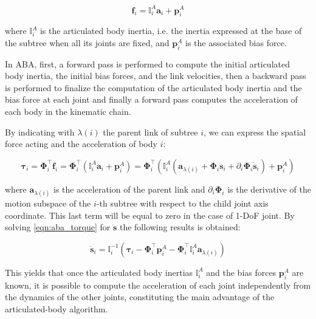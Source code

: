 \begin{equation}
    \label{eqn:biasforce}
    \mathbf{f} _i = \mathbb{I} _i ^A \mathbf{a} _i + \mathbf{p} ^A _i
\end{equation}

where $\mathbb{I} _i ^A$ is the articulated body inertia, i.e. the inertia expressed at the base of the subtree when all its joints are fixed, and $\mathbf{p} ^A _i$ is the associated bias force.

In ABA, first, a forward pass is performed to compute the initial articulated body inertia, the initial bias forces, and the link velocities, then a backward pass is performed to finalize the computation of the articulated body inertia and the bias force at each joint and finally a forward pass computes the acceleration of each body in the kinematic chain.

By indicating with $\lambda(i)$ the parent link of subtree $i$, we can express the spatial force acting and the acceleration of body $i$:

\begin{equation}
    \label{eqn:aba_torque}
    \boldsymbol{\tau} _i = \boldsymbol{\Phi} ^\top _i \mathbf{f} _i = \boldsymbol{\Phi} ^\top _i (\mathbb{I} _i ^A \mathbf{a} _i + \mathbf{p} ^A _i) = \boldsymbol{\Phi} ^\top _i (\mathbb{I} _i ^A (\mathbf{a} _{\lambda(i)} + \boldsymbol{\Phi} _i \ddot{\mathbf{s}} _i + \partial_i \boldsymbol{\Phi} _i \dot{\mathbf{s}} _i)+ \mathbf{p} ^A _i)
\end{equation}

where $\mathbf{a} _{\lambda(i)}$ is the acceleration of the parent link and $\partial_i \boldsymbol{\Phi} _i$ is the derivative of the motion subspace of the $i$-th subtree with respect to the child joint axis coordinate. This last term will be equal to zero in the case of 1-\ac{DoF} joint.
By solving \cref{eqn:aba_torque} for $\ddot{\mathbf{s}}$ the following results is obtained:

\begin{equation}
    \ddot{\mathbf{s}} _i = \mathbb{I} _i ^{-1} (\boldsymbol{\tau} _i - \boldsymbol{\Phi} ^\top _i \mathbf{p} ^A _i - \boldsymbol{\Phi} ^\top _i \mathbb{I} _i ^A \mathbf{a} _{\lambda(i)})
\end{equation}

This yields that once the articulated body inertias $\mathbb{I} _i ^A$ and the bias forces $\mathbf{p}_i ^A$ are known, it is possible to compute the acceleration of each joint independently from the dynamics of the other joints, constituting the main advantage of the articulated-body algorithm.


